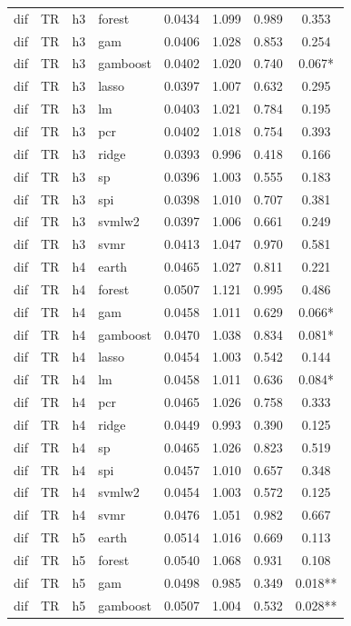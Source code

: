 \begin{ThreePartTable}
\begin{longtable}[t]{llclcccc}
dif & TR & h3 & forest & 0.0434 & 1.099 & 0.989 & 0.353\\
dif & TR & h3 & gam & 0.0406 & 1.028 & 0.853 & 0.254\\
dif & TR & h3 & gamboost & 0.0402 & 1.020 & 0.740 & 0.067*\\
dif & TR & h3 & lasso & 0.0397 & 1.007 & 0.632 & 0.295\\
dif & TR & h3 & lm & 0.0403 & 1.021 & 0.784 & 0.195\\
dif & TR & h3 & pcr & 0.0402 & 1.018 & 0.754 & 0.393\\
dif & TR & h3 & ridge & 0.0393 & 0.996 & 0.418 & 0.166\\
dif & TR & h3 & sp & 0.0396 & 1.003 & 0.555 & 0.183\\
dif & TR & h3 & spi & 0.0398 & 1.010 & 0.707 & 0.381\\
dif & TR & h3 & svmlw2 & 0.0397 & 1.006 & 0.661 & 0.249\\
dif & TR & h3 & svmr & 0.0413 & 1.047 & 0.970 & 0.581\\
\addlinespace
dif & TR & h4 & earth & 0.0465 & 1.027 & 0.811 & 0.221\\
dif & TR & h4 & forest & 0.0507 & 1.121 & 0.995 & 0.486\\
dif & TR & h4 & gam & 0.0458 & 1.011 & 0.629 & 0.066*\\
dif & TR & h4 & gamboost & 0.0470 & 1.038 & 0.834 & 0.081*\\
dif & TR & h4 & lasso & 0.0454 & 1.003 & 0.542 & 0.144\\
dif & TR & h4 & lm & 0.0458 & 1.011 & 0.636 & 0.084*\\
dif & TR & h4 & pcr & 0.0465 & 1.026 & 0.758 & 0.333\\
dif & TR & h4 & ridge & 0.0449 & 0.993 & 0.390 & 0.125\\
dif & TR & h4 & sp & 0.0465 & 1.026 & 0.823 & 0.519\\
dif & TR & h4 & spi & 0.0457 & 1.010 & 0.657 & 0.348\\
dif & TR & h4 & svmlw2 & 0.0454 & 1.003 & 0.572 & 0.125\\
dif & TR & h4 & svmr & 0.0476 & 1.051 & 0.982 & 0.667\\
\addlinespace
dif & TR & h5 & earth & 0.0514 & 1.016 & 0.669 & 0.113\\
dif & TR & h5 & forest & 0.0540 & 1.068 & 0.931 & 0.108\\
dif & TR & h5 & gam & 0.0498 & 0.985 & 0.349 & 0.018**\\
dif & TR & h5 & gamboost & 0.0507 & 1.004 & 0.532 & 0.028**\\

\end{longtable}
\end{ThreePartTable}
